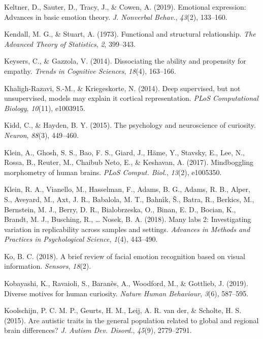 \documentclass[11pt,american,]{memoir} %
\begin{document}
\leavevmode\hypertarget{ref-Keltner2019-tm}{}%
Keltner, D., Sauter, D., Tracy, J., \& Cowen, A. (2019). Emotional expression: Advances in basic emotion theory. \emph{J. Nonverbal Behav.}, \emph{43}(2), 133--160.

\leavevmode\hypertarget{ref-kendall1973functional}{}%
Kendall, M. G., \& Stuart, A. (1973). Functional and structural relationship. \emph{The Advanced Theory of Statistics}, \emph{2}, 399--343.

\leavevmode\hypertarget{ref-keysers2014dissociating}{}%
Keysers, C., \& Gazzola, V. (2014). Dissociating the ability and propensity for empathy. \emph{Trends in Cognitive Sciences}, \emph{18}(4), 163--166.

\leavevmode\hypertarget{ref-khaligh2014deep}{}%
Khaligh-Razavi, S.-M., \& Kriegeskorte, N. (2014). Deep supervised, but not unsupervised, models may explain it cortical representation. \emph{PLoS Computational Biology}, \emph{10}(11), e1003915.

\leavevmode\hypertarget{ref-kidd2015psychology}{}%
Kidd, C., \& Hayden, B. Y. (2015). The psychology and neuroscience of curiosity. \emph{Neuron}, \emph{88}(3), 449--460.

\leavevmode\hypertarget{ref-Klein2017-su}{}%
Klein, A., Ghosh, S. S., Bao, F. S., Giard, J., Häme, Y., Stavsky, E., Lee, N., Rossa, B., Reuter, M., Chaibub Neto, E., \& Keshavan, A. (2017). Mindboggling morphometry of human brains. \emph{PLoS Comput. Biol.}, \emph{13}(2), e1005350.

\leavevmode\hypertarget{ref-Klein2018-un}{}%
Klein, R. A., Vianello, M., Hasselman, F., Adams, B. G., Adams, R. B., Alper, S., Aveyard, M., Axt, J. R., Babalola, M. T., Bahnı́k, Š., Batra, R., Berkics, M., Bernstein, M. J., Berry, D. R., Bialobrzeska, O., Binan, E. D., Bocian, K., Brandt, M. J., Busching, R., \ldots{} Nosek, B. A. (2018). Many labs 2: Investigating variation in replicability across samples and settings. \emph{Advances in Methods and Practices in Psychological Science}, \emph{1}(4), 443--490.

\leavevmode\hypertarget{ref-Ko2018-rv}{}%
Ko, B. C. (2018). A brief review of facial emotion recognition based on visual information. \emph{Sensors}, \emph{18}(2).

\leavevmode\hypertarget{ref-kobayashi2019diverse}{}%
Kobayashi, K., Ravaioli, S., Baranès, A., Woodford, M., \& Gottlieb, J. (2019). Diverse motives for human curiosity. \emph{Nature Human Behaviour}, \emph{3}(6), 587--595.

\leavevmode\hypertarget{ref-Koolschijn2015-hd}{}%
Koolschijn, P. C. M. P., Geurts, H. M., Leij, A. R. van der, \& Scholte, H. S. (2015). Are autistic traits in the general population related to global and regional brain differences? \emph{J. Autism Dev. Disord.}, \emph{45}(9), 2779--2791.
\end{document}
